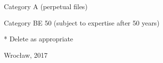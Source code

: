 \documentclass[12pt,a4paper,twoside]{book}
\begin{document}
\begin{titlepage}
\begin{flushleft}
\begin{compactenum}
\item Category A (perpetual files)
\item Category BE 50 (subject to expertise after 50 years)
\end{compactenum}
* Delete as appropriate
\end{flushleft}
\vspace*{12pt}
\begin{flushright}
\end{flushright}
\vspace*{12pt}
\begin{center}
Wrocław, 2017
\end{center}
\end{titlepage}
\restoregeometry
\end{document}
